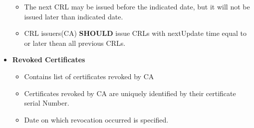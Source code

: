 \documentclass[12pt]{report}
\begin{document}
\begin{itemize}
\begin{itemize}
                \item The next CRL may be issued before the indicated date, but it will not
                    be issued later than indicated date.
                \item CRL issuers(CA) \textbf{SHOULD} issue CRLs with nextUpdate time equal
                    to or later thean all previous CRLs.
            \end{itemize}
        \item \textbf{Revoked Certificates}
            \begin{itemize}
                \item Contains list of certificates revoked by CA
                \item Certificates revoked by CA are uniquely identified by their certificate serial Number. 
                \item Date on which revocation occurred is specified.
            \end{itemize}
    \end{itemize}
\end{document}
